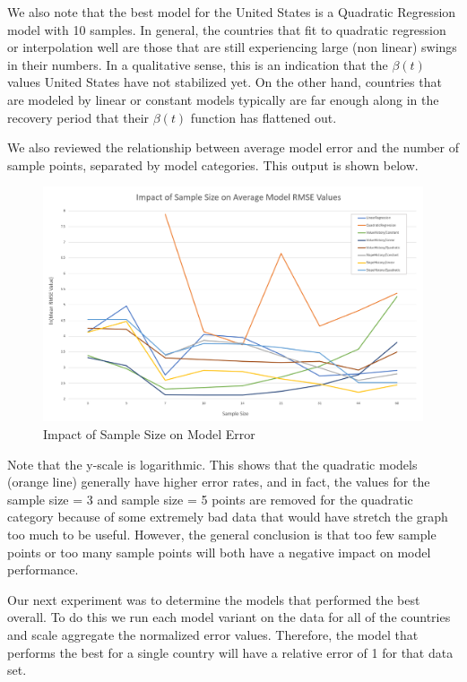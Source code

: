 \documentclass[11pt]{article}
\begin{document}
We also note that the best model for the United States is a Quadratic Regression model with 10 samples. In general, the countries that fit to quadratic regression or interpolation well are those that are still experiencing large (non linear) swings in their numbers. In a qualitative sense, this is an indication that the $\beta(t)$ values United States have not stabilized yet. On the other hand, countries that are modeled by linear or constant models typically are far enough along in the recovery period that their $\beta(t)$ function has flattened out.

We also reviewed the relationship between average model error and the number of sample points, separated by model categories. This output is shown below.

\begin{figure}[h]
    \includegraphics[width=16cm]{images/SampleSizeGraph.png}
    \centering
    \caption{Impact of Sample Size on Model Error}
    \label{fig:sample-size-graph}
\end{figure}

Note that the y-scale is logarithmic. This shows that the quadratic models (orange line) generally have higher error rates, and in fact, the values for the sample size = 3 and sample size = 5 points are removed for the quadratic category because of some extremely bad data that would have stretch the graph too much to be useful. However, the general conclusion is that too few sample points or too many sample points will both have a negative impact on model performance.

Our next experiment was to determine the models that performed the best overall. To do this we run each model variant on the data for all of the countries and scale aggregate the normalized error values. Therefore, the model that performs the best for a single country will have a relative error of 1 for that data set.
\end{document}
